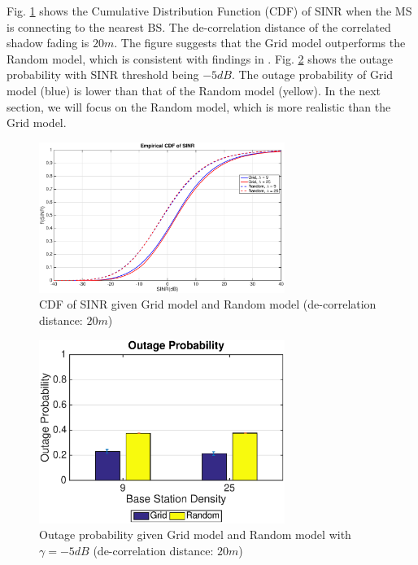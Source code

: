 \documentclass[journal,10pt]{IEEEtran}
\begin{document}
 \par Fig. \ref{4:cdf1} shows the Cumulative Distribution Function (CDF) of SINR when the MS is connecting to the nearest BS. The de-correlation distance of the correlated shadow fading is $20m$. The figure suggests that the Grid model outperforms the Random model, which is consistent with findings in \cite{andrews2011tractable}. Fig. \ref{4:outage1} shows the outage probability with SINR threshold being $-5dB$. The outage probability of Grid model (blue) is lower than that of the Random model (yellow). In the next section, we will focus on the Random model, which is more realistic than the Grid model.
 \begin{figure}
 \centering
 \includegraphics[width=8cm]{GridVSRandom.eps}
 \caption{CDF of SINR given Grid model and Random model (de-correlation distance: $20m$)}
 \label{4:cdf1}
 \end{figure}
 \begin{figure}
 \centering
 \includegraphics[width=8cm]{OutageProbGridVSRandom.eps}
 \caption{Outage probability given Grid model and Random model with $\gamma = -5dB$ (de-correlation distance: $20m$)}
 \label{4:outage1}
 \end{figure}
\end{document}
